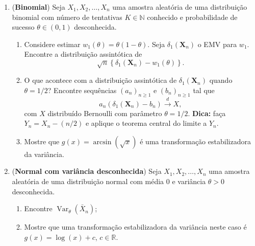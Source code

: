 \documentclass[a4paper,10pt, notitlepage]{report}
\newcommand{\vr}{\operatorname{Var}} %
\newcommand{\rs}{X_1, X_2, \ldots, X_n} %
\newcommand{\bX}{\boldsymbol{X}} %
\begin{document}
\begin{enumerate}
 \item (\textbf{Binomial}) Seja $\rs$ uma amostra aleatória de uma distribuição binomial com número de tentativas $K \in \mathbb{N}$ conhecido e probabilidade de sucesso $\theta \in (0, 1)$ desconhecida.
 \begin{enumerate}
     \item Considere estimar $w_1(\theta) = \theta(1-\theta)$.
     Seja $\delta_1(\bX_n)$ o EMV para $w_1$.
     Encontre a distribuição assintótica de 
     \begin{equation*}
        \sqrt{n}\left\{\delta_1(\bX_n) - w_1(\theta)\right\}.
     \end{equation*}
     \item O que acontece com a distribuição assintótica de $\delta_1(\bX_n)$ quando $\theta = 1/2$? Encontre sequências $(a_n)_{n\geq1}$ e $(b_n)_{n\geq1}$ tal que 
     \begin{equation*}
         a_n\left(\delta_1(\bX_n) - b_n\right) \xrightarrow{d} X,
     \end{equation*}
     com $X$ distribuído Bernoulli com parâmetro $\theta = 1/2$.
     \textbf{Dica:} faça $Y_n = X_n-(n/2)$ e aplique o teorema central do limite a $Y_n$. 
     \item Mostre que $g(x) = \arcsin(\sqrt{x})$ é uma transformação estabilizadora da variância.
 \end{enumerate}
 \item (\textbf{Normal com variância desconhecida}) 
 Seja $\rs$ uma amostra aleatória de uma distribuição normal com média 0 e variância $\theta >0$ desconhecida. 
 \begin{enumerate}
         \item Encontre $\vr_\theta(\bar{X}_n)$;
         \item Mostre que uma transformação estabilizadora da variância neste caso é $g(x) = \log(x) + c$, $c \in \mathbb{R}$.
 \end{enumerate}
 
\end{enumerate}
% 
% 
\end{document}
